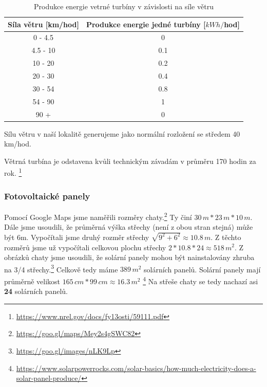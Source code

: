 \begin{center}
    \begin{table}[!h]
        \centering
        \begin{tabular}{|c|c|}
            \hline
            Síla větru [km/hod] & Produkce energie jedné turbíny [$kWh/$hod] \\
            \hline
            \hline
            0 - 4.5 & 0 \\
            \hline
            4.5 - 10 & 0.1 \\
            \hline
            10 - 20 & 0.2 \\
            \hline
            20 - 30 & 0.4 \\
            \hline
            30 - 54 & 0.8 \\
            \hline
            54 - 90 & 1 \\
            \hline
            90 + & 0 \\
            \hline
        \end{tabular}
        \caption{Produkce energie vetrné turbíny v závislosti na síle větru}
        \label{tab:wind_energy}
    \end{table}
\end{center}

Sílu větru v naší lokalitě generujeme jako normální rozložení se středem 40\,km/hod.

Větrná turbína je odstavena kvůli technickým závadám v průměru 170 hodin za rok. \footnote{\url{https://www.nrel.gov/docs/fy13osti/59111.pdf}}



\subsubsection{Fotovoltaické panely}

Pomocí Google Maps jsme naměřili rozměry chaty.\footnote{\url{https://goo.gl/maps/Mey2s4gSWC82}} Ty činí $30\,m * 23\,m * 10\,m$. Dále jsme usoudili, že průměrná výška střechy (není z obou stran stejná) může být 6m. Vypočítali jsme druhý rozměr střechy $\sqrt{9^{2}+6^{2}} \approx 10.8\,m$. Z těchto rozměrů jsme už vypočítali celkovou plochu střechy $2*10.8*24 \approx 518\,m^2$. Z obrázků chaty jsme usoudili, že solární panely mohou být nainstalovány zhruba na 3/4 střechy.\footnote{\url{https://goo.gl/images/nLK9Lp}} Celkově tedy máme {\boldmath$389\,m^2$} solárních panelů. Solární panely mají průměrně velikost $165\,cm * 99\,cm \approx 16.3\,m^2$ \footnote{\url{https://www.solarpowerrocks.com/solar-basics/how-much-electricity-does-a-solar-panel-produce/}} Na střeše chaty se tedy nachazí asi \textbf{24} solárních panelů.

